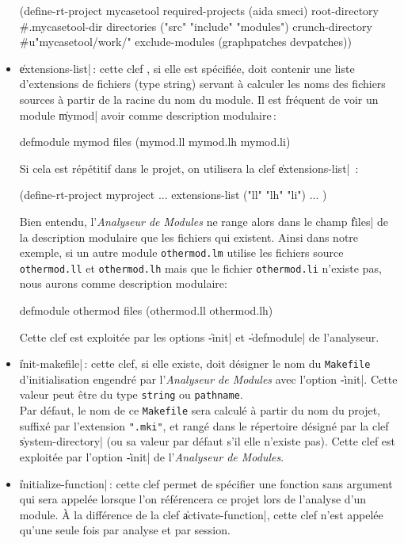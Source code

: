 \begin{itemize}
\begin{Code*}
(define-rt-project mycasetool
        required-projects (aida smeci)
        root-directory #.mycasetool-dir
        directories ("src" "include" "modules")
        crunch-directory #u"mycasetool/work/"
        exclude-modules (graphpatches devpatches))
\end{Code*}

\item {\Large \|extensions-list|}\,: cette clef , si elle est
sp\'{e}cifi\'{e}e, doit contenir une liste d'extensions de fichiers (type
string) servant \`{a} calculer les noms des fichiers sources \`{a} partir de
la racine du nom du module. Il est fr\'{e}quent de voir un module
\|mymod| avoir comme description modulaire\,:
\begin{Code*}
defmodule mymod
files (mymod.ll mymod.lh mymod.li)
\end{Code*}
Si cela est r\'{e}p\'{e}titif dans le projet, on utilisera la clef
\|extensions-list|\ : 
\begin{Code*}
(define-rt-project myproject
  ...
  extensions-list ("ll" "lh" "li")
  ...
)
\end{Code*}
Bien entendu, l'{\em Analyseur de Modules} ne range alors dans le champ
\|files| de la description modulaire que les fichiers qui existent.
Ainsi dans notre exemple, si un autre module {\tt othermod.lm}
utilise les fichiers source {\tt othermod.ll} et {\tt othermod.lh}
mais que le fichier {\tt othermod.li} n'existe pas, nous aurons comme
description modulaire:
\begin{Code*}
defmodule othermod
files (othermod.ll othermod.lh)
\end{Code*}
Cette clef est exploit\'{e}e par les options \|-init| et \|-defmodule| de
l'analyseur.

\item {\Large \|init-makefile|}\,: cette clef, si elle existe, doit
d\'{e}signer le nom du {\tt Makefile} d'initialisation engendr\'{e} par
l'{\em Analyseur de Modules} avec l'option \|-init|. Cette
valeur peut \^{e}tre du type {\tt string} ou {\tt pathname}.  \\
Par d\'{e}faut, le nom de ce {\tt Makefile} sera calcul\'{e} \`{a}
partir du nom du projet, suffix\'{e} par l'extension {\tt ".mki"}, et
rang\'{e} dans le r\'{e}pertoire d\'{e}sign\'{e} par la clef \|system-directory|
(ou sa valeur par d\'{e}faut s'il elle n'existe pas).
Cette clef est exploit\'{e}e par l'option \|-init| de l'{\em Analyseur de
Modules}.

\item {\Large \|initialize-function|}\,: cette clef permet de sp\'{e}cifier
une fonction sans argument qui sera appel\'{e}e lorsque l'on
r\'{e}f\'{e}rencera ce projet lors de l'analyse d'un module. \`{A} la
diff\'{e}rence de la clef \|activate-function|, cette clef n'est appel\'{e}e
qu'une seule fois par analyse et par session. 


\end{itemize}
